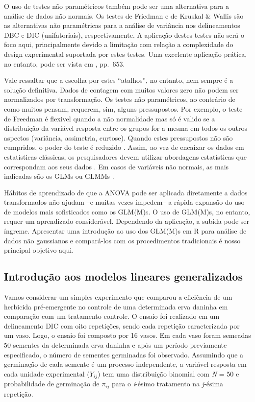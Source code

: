 \documentclass[
]{book}
\begin{document}
O uso de testes não paramétricos também pode ser uma alternativa para a análise de dados não normais. Os testes de Friedman \citep{Friedman1937} e de Kruskal \& Wallis \citep{Kruskal1952} são as alternativas não paramétricas para a análise de variância nos delineamentos DBC e DIC (unifatoriais), respectivamente. A aplicação destes testes não será o foco aqui, principalmente devido a limitação com relação a complexidade do design experimental suportada por estes testes. Uma excelente aplicação prática, no entanto, pode ser vista em \citet{Field2012}, pp.~653.

Vale ressaltar que a escolha por estes ``atalhos'', no entanto, nem sempre é a solução definitiva. Dados de contagem com muitos valores zero não podem ser normalizados por transformação. Os testes não paramétricos, ao contrário de como muitos pensam, requerem, sim, alguns pressupostos. Por exemplo, o teste de Freedman é flexivel quando a não normalidade mas só é valido se a distribuição da variável resposta entre os grupos for a mesma em todos os outros aspectos (variância, assimetria, curtose). Quando estes pressupostos não são cumpridos, o poder do teste é reduzido \citep{Laurent2013}. Assim, ao vez de encaixar os dados em estatísticas clássicas, os pesquisadores devem utilizar abordagens estatísticas que correspondam aos seus dados \citep{Mora2008}. Em casos de variáveis não normais, as mais indicadas são os GLMs \citep{Nelder1972} ou GLMMs \citep{Wolfinger1993}.

Hábitos de aprendizado de que a ANOVA pode ser aplicada diretamente a dados transformados não ajudam --e muitas vezes impedem-- a rápida expansão do uso de modelos mais sofisticados como os GLM(M)s. O uso de GLM(M)s, no entanto, requer um aprendizado considerável. Dependendo da aplicação, a subida pode ser íngreme. Apresentar uma introdução ao uso dos GLM(M)s em R para análise de dados não gaussianos e compará-los com os procedimentos tradicionais é nosso principal objetivo aqui.

\hypertarget{introduuxe7uxe3o-aos-modelos-lineares-generalizados}{%
\subsection{Introdução aos modelos lineares generalizados}\label{introduuxe7uxe3o-aos-modelos-lineares-generalizados}}

Vamos considerar um simples experimento que comparou a eficiência de um herbicida pré-emergente no controle de uma determinada erva daninha em comparação com um tratamento controle. O ensaio foi realizado em um delineamento DIC com oito repetições, sendo cada repetição caracterizada por um vaso. Logo, o ensaio foi composto por 16 vasos. Em cada vaso foram semeadas 50 sementes da determinada erva daninha e após um período previamente especificado, o número de sementes germinadas foi observado. Assumindo que a germinação de cada semente é um processo independente, a variável resposta em cada unidade experimental (\(Y_{ij}\)) tem uma distribuição binomial com \emph{N} = 50 e probabilidade de germinação de \(\pi_{ij}\) para o \emph{i}-ésimo tratamento na \emph{j}-ésima repetição.
\end{document}
